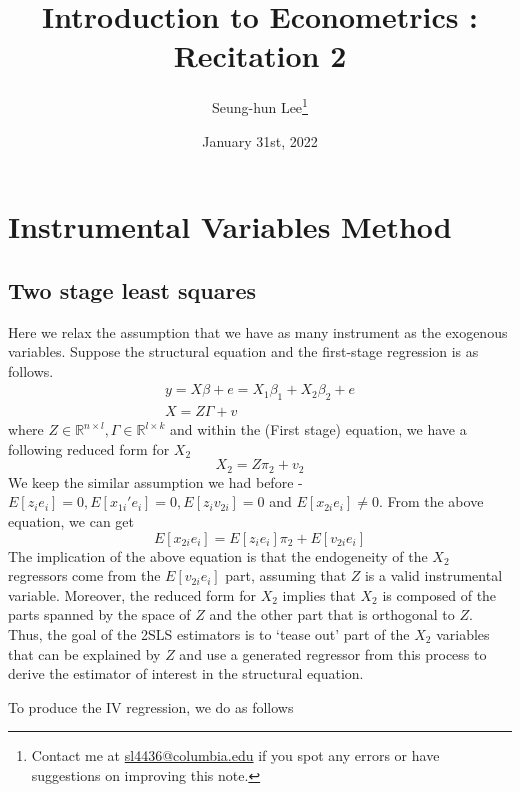 \documentclass[12pt]{article}
\title{Introduction to Econometrics \ROM{2}: Recitation 2}
\theoremstyle{definition}
\theoremstyle{property}
\theoremstyle{assumption}
\theoremstyle{example}
\theoremstyle{comment}
\begin{document}
\linespread{1.25}
\onehalfspacing

\author{Seung-hun Lee\footnote{Contact me at \href{mailto:sl4436@columbia.edu}{sl4436@columbia.edu} if you spot any errors or have suggestions on improving this note.}}
\date{January 31st, 2022}
\maketitle
\thispagestyle{firstpage}

\section{Instrumental Variables Method}
\subsection{Two stage least squares}
Here we relax the assumption that we have as many instrument as the exogenous variables.  Suppose the structural equation and the first-stage regression is as follows.
\begin{gather*}
y=X\beta+e = X_1\beta_1 + X_2\beta_2+e \tag{Structural}\\
X=Z\Gamma+v \tag{First Stage}
\end{gather*}
where $Z\in\mathbb{R}^{n\times l},\Gamma\in\mathbb{R}^{l\times k}$ and within the (First stage) equation, we have a following reduced form for $X_2$
\[
X_2 = Z\pi_2+v_2
\]
We keep the similar assumption we had before - $E[z_ie_i]=0, E[x_{1i}'e_i]=0, E[z_iv_{2i}]=0$ and $E[x_{2i}e_i]\neq0$. From the above equation, we can get
\[
E[x_{2i}e_i]=E[z_ie_i]\pi_2+E[v_{2i}e_i]
\]
The implication of the above equation is that the endogeneity of the $X_2$ regressors come from the $E[v_{2i}e_i]$ part, assuming that $Z$ is a valid instrumental variable. Moreover, the reduced form for $X_2$ implies that $X_2$ is composed of the parts spanned by the space of $Z$ and the other part that is orthogonal to $Z$. Thus, the goal of the 2SLS estimators is to `tease out' part of the $X_2$ variables that can be explained by $Z$ and use a generated regressor from this process to derive the estimator of interest in the structural equation. 
\par
To produce the IV regression, we do as follows
\end{document}
